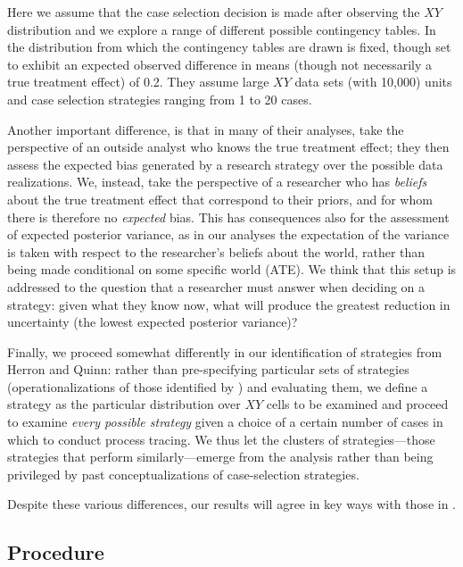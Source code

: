 \documentclass[12pt,]{book}
\begin{document}
Here we assume that the case selection decision is made after observing the \(XY\) distribution and we explore a range of different possible contingency tables. In \citet{HerronQuinn} the distribution from which the contingency tables are drawn is fixed, though set to exhibit an expected observed difference in means (though not necessarily a true treatment effect) of 0.2. They assume large \(XY\) data sets (with 10,000) units and case selection strategies ranging from 1 to 20 cases.

Another important difference, is that in many of their analyses, \citet{HerronQuinn} take the perspective of an outside analyst who knows the true treatment effect; they then assess the expected bias generated by a research strategy over the possible data realizations. We, instead, take the perspective of a researcher who has \emph{beliefs} about the true treatment effect that correspond to their priors, and for whom there is therefore no \emph{expected} bias. This has consequences also for the assessment of expected posterior variance, as in our analyses the expectation of the variance is taken with respect to the researcher's beliefs about the world, rather than being made conditional on some specific world (ATE). We think that this setup is addressed to the question that a researcher must answer when deciding on a strategy: given what they know now, what will produce the greatest reduction in uncertainty (the lowest expected posterior variance)?

Finally, we proceed somewhat differently in our identification of strategies from Herron and Quinn: rather than pre-specifying particular sets of strategies (operationalizations of those identified by \citet{SeawrightGerring2008}) and evaluating them, we define a strategy as the particular distribution over \(XY\) cells to be examined and proceed to examine \emph{every possible strategy} given a choice of a certain number of cases in which to conduct process tracing. We thus let the clusters of strategies---those strategies that perform similarly---emerge from the analysis rather than being privileged by past conceptualizations of case-selection strategies.

Despite these various differences, our results will agree in key ways with those in \citet{HerronQuinn}.

\hypertarget{procedure}{%
\subsection{Procedure}\label{procedure}}
\end{document}
